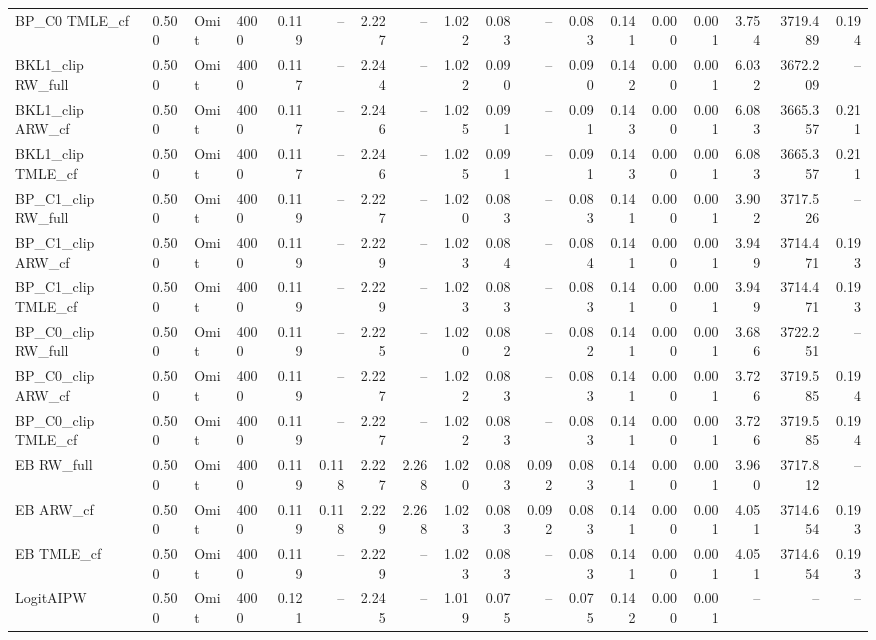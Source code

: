 \begin{tabular}{llllrrrrrrrrrrrrrr}
BP\_C0 TMLE\_cf & 0.500 & Omit & 4000 & 0.119 & -- & 2.227 & -- & 1.022 & 0.083 & -- & 0.083 & 0.141 & 0.000 & 0.001 & 3.754 & 3719.489 & 0.194 \\
BKL1\_clip RW\_full & 0.500 & Omit & 4000 & 0.117 & -- & 2.244 & -- & 1.022 & 0.090 & -- & 0.090 & 0.142 & 0.000 & 0.001 & 6.032 & 3672.209 & -- \\
BKL1\_clip ARW\_cf & 0.500 & Omit & 4000 & 0.117 & -- & 2.246 & -- & 1.025 & 0.091 & -- & 0.091 & 0.143 & 0.000 & 0.001 & 6.083 & 3665.357 & 0.211 \\
BKL1\_clip TMLE\_cf & 0.500 & Omit & 4000 & 0.117 & -- & 2.246 & -- & 1.025 & 0.091 & -- & 0.091 & 0.143 & 0.000 & 0.001 & 6.083 & 3665.357 & 0.211 \\
BP\_C1\_clip RW\_full & 0.500 & Omit & 4000 & 0.119 & -- & 2.227 & -- & 1.020 & 0.083 & -- & 0.083 & 0.141 & 0.000 & 0.001 & 3.902 & 3717.526 & -- \\
BP\_C1\_clip ARW\_cf & 0.500 & Omit & 4000 & 0.119 & -- & 2.229 & -- & 1.023 & 0.084 & -- & 0.084 & 0.141 & 0.000 & 0.001 & 3.949 & 3714.471 & 0.193 \\
BP\_C1\_clip TMLE\_cf & 0.500 & Omit & 4000 & 0.119 & -- & 2.229 & -- & 1.023 & 0.083 & -- & 0.083 & 0.141 & 0.000 & 0.001 & 3.949 & 3714.471 & 0.193 \\
BP\_C0\_clip RW\_full & 0.500 & Omit & 4000 & 0.119 & -- & 2.225 & -- & 1.020 & 0.082 & -- & 0.082 & 0.141 & 0.000 & 0.001 & 3.686 & 3722.251 & -- \\
BP\_C0\_clip ARW\_cf & 0.500 & Omit & 4000 & 0.119 & -- & 2.227 & -- & 1.022 & 0.083 & -- & 0.083 & 0.141 & 0.000 & 0.001 & 3.726 & 3719.585 & 0.194 \\
BP\_C0\_clip TMLE\_cf & 0.500 & Omit & 4000 & 0.119 & -- & 2.227 & -- & 1.022 & 0.083 & -- & 0.083 & 0.141 & 0.000 & 0.001 & 3.726 & 3719.585 & 0.194 \\
EB RW\_full & 0.500 & Omit & 4000 & 0.119 & 0.118 & 2.227 & 2.268 & 1.020 & 0.083 & 0.092 & 0.083 & 0.141 & 0.000 & 0.001 & 3.960 & 3717.812 & -- \\
EB ARW\_cf & 0.500 & Omit & 4000 & 0.119 & 0.118 & 2.229 & 2.268 & 1.023 & 0.083 & 0.092 & 0.083 & 0.141 & 0.000 & 0.001 & 4.051 & 3714.654 & 0.193 \\
EB TMLE\_cf & 0.500 & Omit & 4000 & 0.119 & -- & 2.229 & -- & 1.023 & 0.083 & -- & 0.083 & 0.141 & 0.000 & 0.001 & 4.051 & 3714.654 & 0.193 \\
LogitAIPW & 0.500 & Omit & 4000 & 0.121 & -- & 2.245 & -- & 1.019 & 0.075 & -- & 0.075 & 0.142 & 0.000 & 0.001 & -- & -- & -- \\

\end{tabular}
